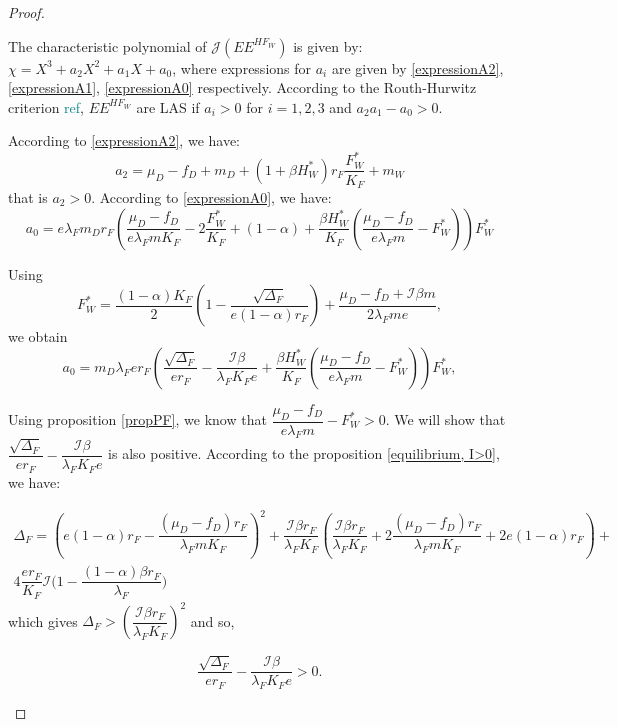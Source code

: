 \documentclass{article}
\newcommand{\lfw}{\lambda_{F}}
\newcommand{\lfw}{\lambda_{F}}
\newcommand{\cI}{\mathcal{I}}
\newcommand{\marc}[1]{\textcolor{teal}{#1}}
\begin{document}
\begin{proof}
\begin{itemize}
The characteristic polynomial of $\mathcal{J}(EE^{H F_W})$ is given by: $\chi = X^3 + a_2 X^2 + a_1 X + a_0$, where expressions for $a_i$ are given by \eqref{expressionA2}, \eqref{expressionA1}, \eqref{expressionA0} respectively. According to the Routh-Hurwitz criterion \marc{ref}, $EE^{H F_W}$ are LAS if $a_i > 0$ for $i=1,2,3$ and $a_2 a_1 - a_0 > 0$.

According to \eqref{expressionA2}, we have:
\begin{equation*}
a_2 = \mu_D -f_D + m_D + (1+\beta H_W^*)r_F \dfrac{F_W^*}{K_F} + m_W 
\end{equation*}
that is $a_2>0$. According to \eqref{expressionA0}, we have:
\begin{equation*}
a_0 = e \lfw m_D r_F \left(\dfrac{\mu_D -f_D }{e \lfw m K_F} - 2\dfrac{F_W^*}{K_F} + (1-\alpha) + \dfrac{\beta H_W^*}{K_F} \left(\dfrac{\mu_D -f_D }{e \lfw m} - F_W^*\right) \right) F_W^*
\end{equation*}

Using
\begin{equation*}
F_W^* = \dfrac{(1-\alpha)K_F}{2}\left(1 - \dfrac{\sqrt{\Delta_F}}{e(1-\alpha)r_F}\right) + \dfrac{\mu_D - f_D + \cI \beta m}{2\lfw m e},
\end{equation*}
we obtain
\begin{equation*}
a_0 = m_D \lfw e r_F \left(\dfrac{\sqrt{\Delta_F}}{er_F} - \dfrac{\cI \beta}{\lfw K_F e} +  \dfrac{\beta H_W^*}{K_F} \left(\dfrac{\mu_D -f_D }{e \lfw m} - F_W^*\right)\right)  F^*_{W},
\end{equation*}

Using proposition \eqref{propPF}, we know that $\dfrac{\mu_D -f_D }{e \lfw m} - F_W^* > 0$. We will show that  $\dfrac{\sqrt{\Delta_F}}{er_F} - \dfrac{\cI \beta}{\lfw K_F e}$ is also positive. According to the proposition \ref{equilibrium, I>0}, we have:

\begin{multline*}
\Delta_F = \left(e(1-\alpha)r_F - \dfrac{(\mu_D - f_D) r_F}{\lfw m K_F}\right)^2 + \dfrac{\cI \beta r_F}{\lfw K_F} \left(\dfrac{\cI \beta r_F}{\lfw K_F} + 2\dfrac{(\mu_D - f_D) r_F}{\lfw m K_F} + 2e(1-\alpha)r_F \right) + \\ 4\dfrac{er_F}{K_F}  \cI\Big(1 - \dfrac{(1-\alpha)\beta r_F}{\lfw} \Big)
\end{multline*}
 which gives $\Delta_F > \left(\dfrac{\cI \beta r_F}{\lfw K_F}\right)^2$ and so,

\begin{equation*}
\dfrac{\sqrt{\Delta_F}}{er_F} - \dfrac{\cI \beta}{\lfw K_F e} > 0.
\end{equation*}


\end{itemize}
\end{proof}
\end{document}
